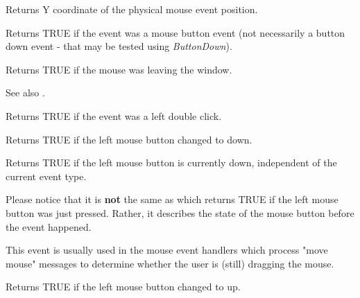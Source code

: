 \label{wxmouseeventgety}


Returns Y coordinate of the physical mouse event position.



Returns TRUE if the event was a mouse button event (not necessarily a button down event -
that may be tested using {\it ButtonDown}).

\label{wxmouseeventleaving}


Returns TRUE if the mouse was leaving the window.

See also .



Returns TRUE if the event was a left double click.

\label{wxmouseeventleftdown}


Returns TRUE if the left mouse button changed to down.



Returns TRUE if the left mouse button is currently down, independent
of the current event type.

Please notice that it is {\bf not} the same as 
 which returns TRUE if the left mouse
button was just pressed. Rather, it describes the state of the mouse button
before the event happened.

This event is usually used in the mouse event handlers which process "move
mouse" messages to determine whether the user is (still) dragging the mouse.



Returns TRUE if the left mouse button changed to up.



